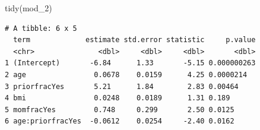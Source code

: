 \documentclass[
  letterpaper,
  DIV=11,
  numbers=noendperiod]{scrartcl}
\newenvironment{Shaded}{\begin{snugshade}}{\end{snugshade}}
\newcommand{\FunctionTok}[1]{\textcolor[rgb]{0.28,0.35,0.67}{#1}}
\newcommand{\NormalTok}[1]{\textcolor[rgb]{0.00,0.23,0.31}{#1}}
\begin{document}
\begin{Shaded}
\begin{Highlighting}[]
\FunctionTok{tidy}\NormalTok{(mod\_2) }
\end{Highlighting}
\end{Shaded}

\begin{verbatim}
# A tibble: 6 x 5
  term             estimate std.error statistic     p.value
  <chr>               <dbl>     <dbl>     <dbl>       <dbl>
1 (Intercept)       -6.84      1.33       -5.15 0.000000263
2 age                0.0678    0.0159      4.25 0.0000214  
3 priorfracYes       5.21      1.84        2.83 0.00464    
4 bmi                0.0248    0.0189      1.31 0.189      
5 momfracYes         0.748     0.299       2.50 0.0125     
6 age:priorfracYes  -0.0612    0.0254     -2.40 0.0162     
\end{verbatim}
\end{document}

